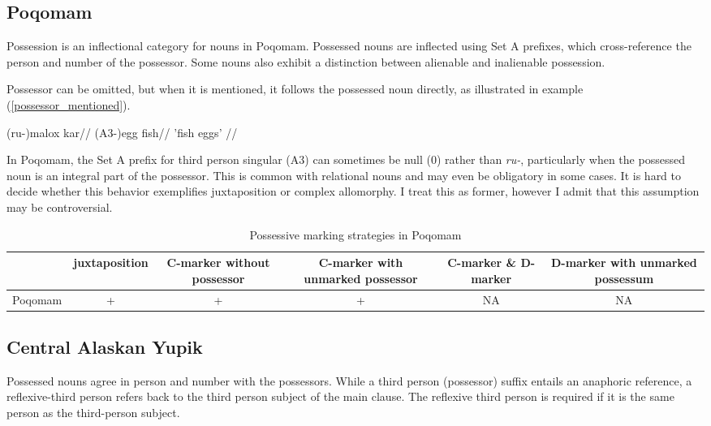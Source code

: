 \subsection{Poqomam}

Possession is an inflectional category for nouns in Poqomam. Possessed nouns are inflected using Set A prefixes, which cross-reference the person and number of the possessor. Some nouns also exhibit a distinction between alienable and inalienable possession.

Possessor can be omitted, but when it is mentioned, it follows the possessed noun directly, as illustrated in example (\ref{possessor_mentioned}). 

\ex
\label{possessor_mentioned}
\begingl
\gla (ru-)malox kar//
\glb (A3-)egg fish//
\glft 'fish eggs' //
\endgl
\xe

In Poqomam, the Set A prefix for third person singular (A3) can sometimes be null (0) rather than \textit{ru-}, particularly when the possessed noun is an integral part of the possessor. This is common with relational nouns and may even be obligatory in some cases. It is hard to decide whether this behavior exemplifies juxtaposition or complex allomorphy. I treat this as former, however I admit that this assumption may be controversial.

\begin{table}[h!]
	\centering
	\small
	\begin{tabular}{@{}cccccc@{}}
		\toprule
		& juxtaposition & \parbox{2.5cm}{C-marker without possessor} & \parbox{2.75cm}{C-marker with unmarked possessor} & \parbox{1.75cm}{C-marker \& D-marker} & \parbox{3cm}{D-marker with unmarked possessum} \\ \midrule
		Poqomam & + & + & + & NA & NA \\ \bottomrule
	\end{tabular}
	\caption{Possessive marking strategies in Poqomam}
\end{table}


\subsection{Central Alaskan Yupik}

Possessed nouns agree in person and number with the possessors. While a third person (possessor) suffix entails an anaphoric reference, a reflexive-third person refers back to the third person subject of the main clause. The reflexive third person is required if it is the same person as the third-person subject.

